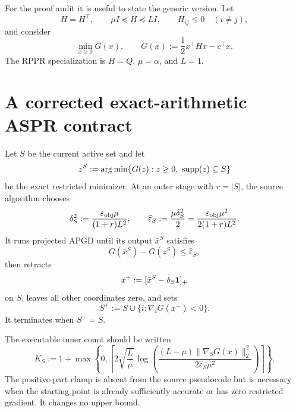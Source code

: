 \documentclass[11pt]{article}
\begin{document}
For the proof audit it is useful to state the generic version.  Let
\begin{equation}
 H=H^\top,
 \qquad
 \mu I\preceq H\preceq LI,
 \qquad
 H_{ij}\leq0\quad(i\neq j),
 \label{eq:generic-H}
\end{equation}
and consider
\begin{equation}
 \min_{x\geq0}G(x),
 \qquad G(x):=\frac12x^\top Hx-c^\top x.
 \label{eq:generic-QP}
\end{equation}
The RPPR specialization is $H=Q$, $\mu=\alpha$, and $L=1$.

\section{A corrected exact-arithmetic ASPR contract}
\label{sec:contract}

Let $S$ be the current active set and let
\begin{equation}
 z^S:=\operatorname*{arg\,min}\{G(z):z\geq0,\ \operatorname{supp}(z)\subseteq S\}
 \label{eq:restricted-minimizer}
\end{equation}
be the exact restricted minimizer.  At an outer stage with $r=|S|$, the
source algorithm chooses
\begin{equation}
 \delta_S^2:=\frac{\varepsilon_{\rm obj}\mu}{(1+r)L^2},
 \qquad
 \widehat\varepsilon_S:=\frac{\mu\delta_S^2}{2}
 =\frac{\varepsilon_{\rm obj}\mu^2}{2(1+r)L^2}.
 \label{eq:inner-tolerances}
\end{equation}
It runs projected APGD until its output $\bar x^S$ satisfies
\begin{equation}
 G(\bar x^S)-G(z^S)\leq\widehat\varepsilon_S,
 \label{eq:inner-gap}
\end{equation}
then retracts
\begin{equation}
 x^+:=[\bar x^S-\delta_S\mathbf{1}]_+
 \label{eq:retraction}
\end{equation}
on $S$, leaves all other coordinates zero, and sets
\begin{equation}
 S^+:=S\cup\{i:\nabla_iG(x^+)<0\}.
 \label{eq:expansion}
\end{equation}
It terminates when $S^+=S$.

The executable inner count should be written
\begin{equation}
 K_S
 :=1+\max\left\{0,
 \left\lceil
  2\sqrt{\frac L\mu}\,
  \log\!\left(
   \frac{(L-\mu)\|\nabla_SG(x)\|_2^2}
        {2\widehat\varepsilon_S\mu^2}
  \right)
 \right\rceil\right\}.
 \label{eq:corrected-inner-count}
\end{equation}
The positive-part clamp is absent from the source pseudocode but is necessary
when the starting point is already sufficiently accurate or has zero
restricted gradient.  It changes no upper bound.
\end{document}
